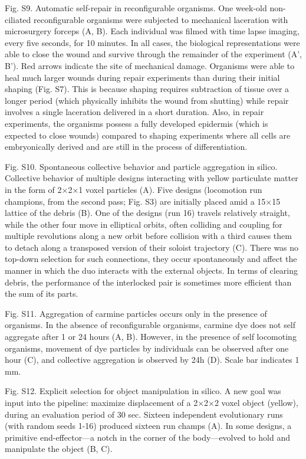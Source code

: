 Fig. S9.  Automatic self-repair in reconfigurable organisms. One week-old non-ciliated reconfigurable organisms were subjected to mechanical laceration with microsurgery forceps (A, B). Each individual was filmed with time lapse imaging, every five seconds, for 10 minutes. In all cases, the biological representations were able to close the wound and survive through the remainder of the experiment (A', B'). Red arrows indicate the site of mechanical damage. Organisms were able to heal much larger wounds during repair experiments than during their initial shaping (Fig. S7). This is because shaping requires subtraction of tissue over a longer period (which physically inhibits the wound from shutting) while repair involves a single laceration delivered in a short duration. Also, in repair experiments, the organisms possess a fully developed epidermis (which is expected to close wounds) compared to shaping experiments where all cells are embryonically derived and are still in the process of differentiation.



Fig. S10.  Spontaneous collective behavior and particle aggregation in silico. Collective behavior of multiple designs interacting with yellow particulate matter in the form of 2{$\times$}2{$\times$}1 voxel particles (A).  Five designs (locomotion run champions, from the second pass; Fig. S3) are initially placed amid a 15{$\times$}15 lattice of the debris (B). One of the designs (run 16) travels relatively straight, while the other four move in elliptical orbits, often colliding and coupling for multiple revolutions along a new orbit before collision with a third causes them to detach along a transposed version of their soloist trajectory (C). There was no top-down selection for such connections, they occur spontaneously and affect the manner in which the duo interacts with the external objects. In terms of clearing debris, the performance of the interlocked pair is sometimes more efficient than the sum of its parts.

Fig. S11.  Aggregation of carmine particles occurs only in the presence of organisms. In the absence of reconfigurable organisms, carmine dye does not self aggregate after 1 or 24 hours (A, B). However, in the presence of self locomoting organisms, movement of dye particles by individuals can be observed after one hour (C), and collective aggregation is observed by 24h (D). Scale bar indicates 1 mm.




Fig. S12.  Explicit selection for object manipulation in silico. A new goal was input into the pipeline: maximize displacement of a 2{$\times$}2{$\times$}2 voxel object (yellow), during an evaluation period of 30 sec. Sixteen independent evolutionary runs (with random seeds 1-16) produced sixteen run champs (A). In some designs, a primitive end-effector---a notch in the corner of the body---evolved to hold and manipulate the object (B, C). 




